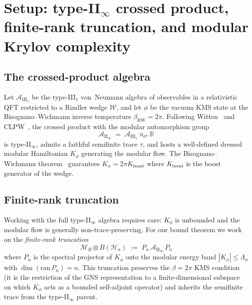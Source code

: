\documentclass[12pt,a4paper]{article}
\begin{document}
\section{Setup: type-II$_\infty$ crossed product, finite-rank truncation,
         and modular Krylov complexity}
\label{sec:setup}

\subsection{The crossed-product algebra}

Let $\mathcal{A}_{\mathrm{III}_1}$ be the type-III$_1$ von~Neumann
algebra of observables in a relativistic QFT restricted to a Rindler
wedge $\mathcal{W}$, and let $\phi$ be the vacuum KMS state at the
Bisognano--Wichmann inverse temperature $\beta_{\mathrm{BW}} = 2\pi$.
Following Witten~\cite{Witten2022} and CLPW~\cite{CLPW2023}, the
crossed product with the modular automorphism group
\begin{equation}
  \mathcal{A}_{\mathrm{II}_\infty}
  \;=\;
  \mathcal{A}_{\mathrm{III}_1} \rtimes_{\sigma^\phi} \mathbb{R}
  \label{eq:crossed}
\end{equation}
is type-II$_\infty$, admits a faithful semifinite trace $\tau$, and
hosts a well-defined dressed modular Hamiltonian $K_\phi$ generating
the modular flow.
The Bisognano--Wichmann theorem~\cite{BisognanoWichmann1976} guarantees
$K_\phi = 2\pi K_{\mathrm{boost}}$ where $K_{\mathrm{boost}}$ is the
boost generator of the wedge.

\subsection{Finite-rank truncation}

Working with the full type-II$_\infty$ algebra requires care: $K_\phi$
is unbounded and the modular flow is generally non-trace-preserving.
For our bound theorem we work on the \emph{finite-rank truncation}
\begin{equation}
  \mathcal{M}_R \otimes B(\mathcal{H}_n)
  \;:=\;
  P_n \,\mathcal{A}_{\mathrm{II}_\infty}\, P_n
  \label{eq:truncation}
\end{equation}
where $P_n$ is the spectral projector of $K_\phi$ onto the modular
energy band $|K_\phi| \le \Lambda_n$ with $\dim(\mathrm{ran}\,P_n) = n$.
This truncation preserves the $\beta = 2\pi$ KMS condition (it is the
restriction of the GNS representation to a finite-dimensional subspace
on which $K_\phi$ acts as a bounded self-adjoint operator) and inherits
the semifinite trace from the type-II$_\infty$ parent.
\end{document}
